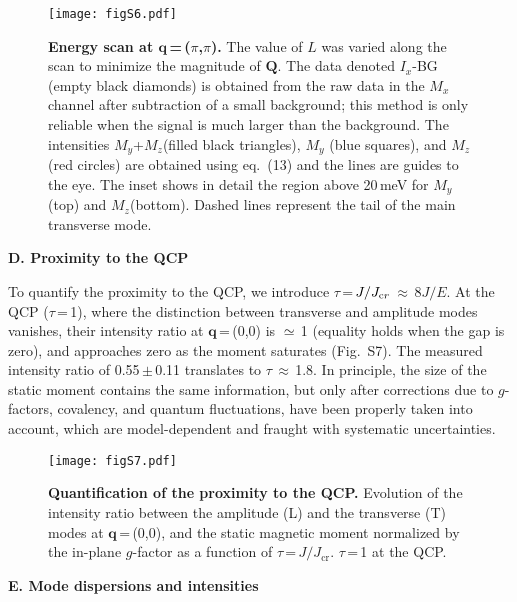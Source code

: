 \documentclass[twocolumn,prb,aps,showpacs]{revtex4-1}
\begin{document}
\begin{figure}
  \centering
  \texttt{[image: figS6.pdf]}
\renewcommand{\thefigure}{S\arabic{figure}}
  \caption{{\bf Energy scan at $\mathbf{q}$\,=\,($\pi$,$\pi$).} The value of $L$ was varied along the scan to minimize the magnitude of $\mathbf{Q}$. The data denoted $I_x$-BG (empty black diamonds) is obtained from the raw data in the $M_x$ channel after subtraction of a small background; this method is only reliable when the signal is much larger than the background. The intensities $M_y$+$M_z$(filled black triangles), $M_y$ (blue squares), and $M_z$(red circles) are obtained using eq.~(13) and the lines are guides to the eye. The inset shows in detail the region above 20\,meV for $M_y$ (top) and $M_z$(bottom). Dashed lines represent the tail of the main transverse mode.}
\label{Fig:pipi}
\end{figure}

\vspace{10 pt}
\noindent
{\bf D. Proximity to the QCP}

To quantify the proximity to the QCP, we introduce $\tau$\,=\,$J/J_{\textrm cr}$\,$\approx$\,$8J/E$. At the QCP ($\tau$\,=\,1), where the distinction between transverse and amplitude modes vanishes, their intensity ratio at $\mathbf{q}$\,=\,(0,0) is $\simeq$\,1 (equality holds when the gap is zero), and approaches zero as the moment saturates (Fig.~S7). The measured intensity ratio of 0.55\,$\pm$\,0.11 translates to $\tau$\,$\approx$\,1.8. In principle, the size of the static moment contains the same information, but only after corrections due to $g$-factors, covalency, and quantum fluctuations, have been properly taken into account, which are model-dependent and fraught with systematic uncertainties. 

\begin{figure}[b]
  \centering
  \texttt{[image: figS7.pdf]}
\renewcommand{\thefigure}{S\arabic{figure}}
  \caption{{\bf Quantification of the proximity to the QCP.} Evolution of the intensity ratio between the amplitude (L) and the transverse (T) modes at $\mathbf{q}$\,=\,(0,0), and the static magnetic moment normalized by the in-plane $g$-factor as a function of $\tau$\,=\,$J/J_\mathrm{cr}$. $\tau$\,=\,1 at the QCP.}
\label{Fig:pipi}
\end{figure}

\vspace{10 pt}
\noindent
{\bf E. Mode dispersions and intensities}
\end{document}
